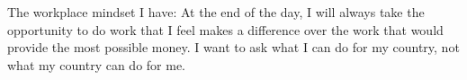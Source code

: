 The workplace mindset I have: At the end of the day, I will always take the opportunity to do work that I feel makes a difference over the work that would provide the most possible money. I want to ask what I can do for my country, not what my country can do for me.